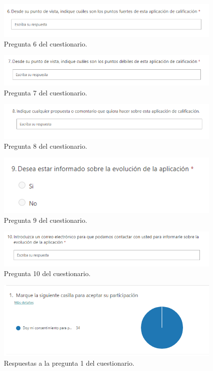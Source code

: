 \begin{figure}[h]
\centering\includegraphics[width=0.5\linewidth]{figs/pregunta_6.png}
\caption{Pregunta 6 del cuestionario.}
\label{Fig:pregunta_6}
\end{figure}

\begin{figure}[h]
\centering\includegraphics[width=0.5\linewidth]{figs/pregunta_7.png}
\caption{Pregunta 7 del cuestionario.}
\label{Fig:pregunta_7}
\end{figure}

\begin{figure}[h]
\centering\includegraphics[width=0.5\linewidth]{figs/pregunta_8.png}
\caption{Pregunta 8 del cuestionario.}
\label{Fig:pregunta_8}
\end{figure}

\begin{figure}[h]
\centering\includegraphics[width=0.5\linewidth]{figs/pregunta_9.png}
\caption{Pregunta 9 del cuestionario.}
\label{Fig:pregunta_9}
\end{figure}

\begin{figure}[h]
\centering\includegraphics[width=1\linewidth]{figs/pregunta_10.png}
\caption{Pregunta 10 del cuestionario.}
\label{Fig:pregunta_10}
\end{figure}

\begin{figure}[h]
\centering\includegraphics[width=1\linewidth]{figs/cuestionario_1.png}
\caption{Respuestas a la pregunta 1 del cuestionario.}
\label{Fig:cuestionario_1}
\end{figure}

